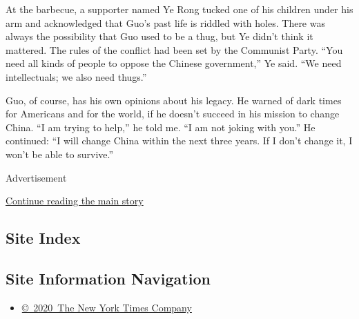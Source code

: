 At the barbecue, a supporter named Ye Rong tucked one of his children
under his arm and acknowledged that Guo's past life is riddled with
holes. There was always the possibility that Guo used to be a thug, but
Ye didn't think it mattered. The rules of the conflict had been set by
the Communist Party. ``You need all kinds of people to oppose the
Chinese government,'' Ye said. ``We need intellectuals; we also need
thugs.''

Guo, of course, has his own opinions about his legacy. He warned of dark
times for Americans and for the world, if he doesn't succeed in his
mission to change China. ``I am trying to help,'' he told me. ``I am not
joking with you.'' He continued: ``I will change China within the next
three years. If I don't change it, I won't be able to survive.''

Advertisement

\protect\hyperlink{after-bottom}{Continue reading the main story}

\hypertarget{site-index}{%
\subsection{Site Index}\label{site-index}}

\hypertarget{site-information-navigation}{%
\subsection{Site Information
Navigation}\label{site-information-navigation}}

\begin{itemize}
\tightlist
\item
  \href{https://help.nytimes.com/hc/en-us/articles/115014792127-Copyright-notice}{©~2020~The
  New York Times Company}
\end{itemize}

